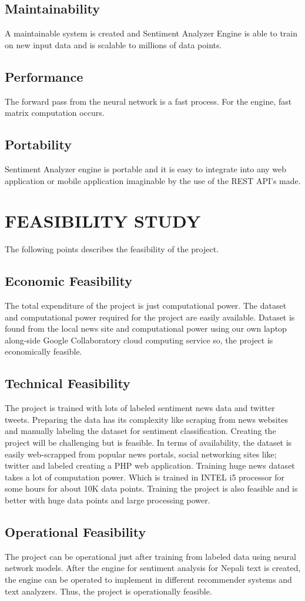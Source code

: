             \subsection{Maintainability}
A maintainable system is created and Sentiment Analyzer Engine is able to train on
new input data and is scalable to millions of data points.
            \subsection{Performance}
The forward pass from the neural network is a fast process. For the engine, fast matrix
computation occurs.
            \subsection{Portability}
Sentiment Analyzer engine is portable and it is easy to integrate into any web
application or mobile application imaginable by the use of the REST API’s made.
        \section{FEASIBILITY STUDY}
The following points describes the feasibility of the project.
            \subsection{Economic Feasibility}
The total expenditure of the project is just computational power. The dataset and
computational power required for the project are easily available. Dataset is found from
the local news site and computational power using our own laptop along-side Google
Collaboratory cloud computing service so, the project is economically feasible.
            \subsection{Technical Feasibility}
The project is trained with lots of labeled sentiment news data and twitter tweets.
Preparing the data has its complexity like scraping from news websites and manually
labeling the dataset for sentiment classification. Creating the project will be challenging
but is feasible. In terms of availability, the dataset is easily web-scrapped from popular
news portals, social networking sites like; twitter and labeled creating a PHP web
application.
Training huge news dataset takes a lot of computation power. Which is trained in
INTEL i5 processor for some hours for about 10K data points. Training the project is
also feasible and is better with huge data points and large processing power.
            \subsection{Operational Feasibility}
The project can be operational just after training from labeled data using neural network
models. After the engine for sentiment analysis for Nepali text is created, the engine
can be operated to implement in different recommender systems and text analyzers.
Thus, the project is operationally feasible.
    
